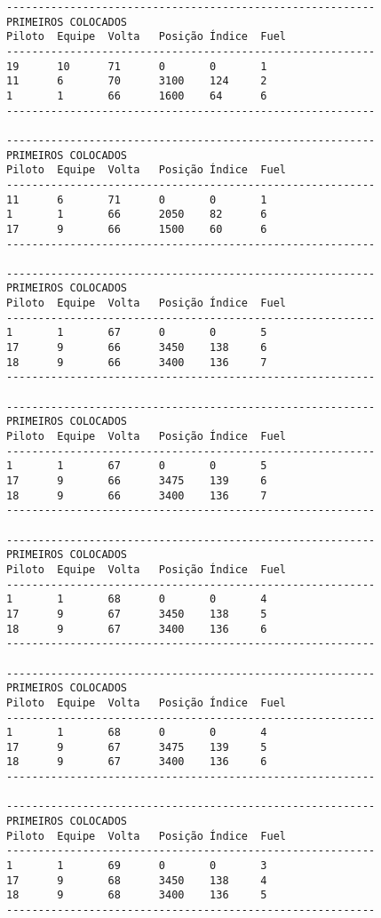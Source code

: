 \documentclass[12pt]{article}
\begin{document}
\begin{verbatim}
----------------------------------------------------------
PRIMEIROS COLOCADOS
Piloto  Equipe  Volta   Posição Índice  Fuel
----------------------------------------------------------
19      10      71      0       0       1
11      6       70      3100    124     2
1       1       66      1600    64      6
----------------------------------------------------------

----------------------------------------------------------
PRIMEIROS COLOCADOS
Piloto  Equipe  Volta   Posição Índice  Fuel
----------------------------------------------------------
11      6       71      0       0       1
1       1       66      2050    82      6
17      9       66      1500    60      6
----------------------------------------------------------

----------------------------------------------------------
PRIMEIROS COLOCADOS
Piloto  Equipe  Volta   Posição Índice  Fuel
----------------------------------------------------------
1       1       67      0       0       5
17      9       66      3450    138     6
18      9       66      3400    136     7
----------------------------------------------------------

----------------------------------------------------------
PRIMEIROS COLOCADOS
Piloto  Equipe  Volta   Posição Índice  Fuel
----------------------------------------------------------
1       1       67      0       0       5
17      9       66      3475    139     6
18      9       66      3400    136     7
----------------------------------------------------------

----------------------------------------------------------
PRIMEIROS COLOCADOS
Piloto  Equipe  Volta   Posição Índice  Fuel
----------------------------------------------------------
1       1       68      0       0       4
17      9       67      3450    138     5
18      9       67      3400    136     6
----------------------------------------------------------

----------------------------------------------------------
PRIMEIROS COLOCADOS
Piloto  Equipe  Volta   Posição Índice  Fuel
----------------------------------------------------------
1       1       68      0       0       4
17      9       67      3475    139     5
18      9       67      3400    136     6
----------------------------------------------------------

----------------------------------------------------------
PRIMEIROS COLOCADOS
Piloto  Equipe  Volta   Posição Índice  Fuel
----------------------------------------------------------
1       1       69      0       0       3
17      9       68      3450    138     4
18      9       68      3400    136     5
----------------------------------------------------------


\end{verbatim}
\end{document}
